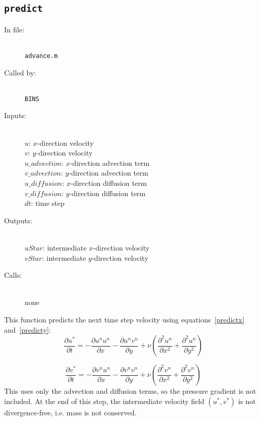 \documentclass[12pt]{article}
\begin{document}
\subsection{\texttt{predict}}
\begin{description}
\item[In file:] \hfill \\ \texttt{advance.m}
\item[Called by:] \hfill \\ \texttt{BINS}
\item[Inputs:] \hfill \\ $u$: $x$-direction velocity\\$v$: $y$-direction velocity\\ $u\_advection$: $x$-direction advection term \\ $v\_advection$: $y$-direction advection term \\$u\_diffusion$: $x$-direction diffusion term \\$v\_diffusion$: $y$-direction diffusion term \\$dt$: time step
\item[Outputs:] \hfill \\ $uStar$: intermediate $x$-direction velocity \\ $vStar$: intermediate $y$-direction velocity
\item[Calls:] \hfill \\ none
\end{description}
This function predicts the next time step velocity using equations~\ref{predictx} and~\ref{predicty}:
\[ 
 \frac{\partial u^*}{\partial t} =   -\frac{\partial u^n u^n}{\partial x} -\frac{\partial u^n v^n}{\partial y} + \nu\left( \frac{\partial^2 u^n}{\partial x^2} + \frac{\partial^2 u^n}{\partial y^2}  \right)  \]

\[
  \frac{\partial v^*}{\partial t} =   -\frac{\partial v^n u^n}{\partial x} -\frac{\partial v^n v^n}{\partial y} + \nu\left( \frac{\partial^2 v^n}{\partial x^2} + \frac{\partial^2 v^n}{\partial y^2}  \right)
\]
This uses only the advection and diffusion terms, so the pressure gradient is not included.  At the end of this step, the intermediate velocity field $(u^*,v^*)$ is not divergence-free, i.e. mass is not conserved.
\end{document}
